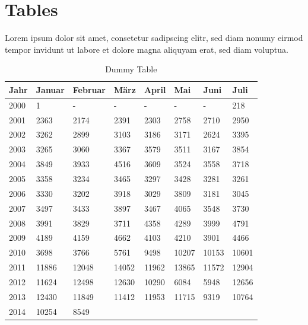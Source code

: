 \documentclass[
        ngerman,
        paper=a4,
        numbers=noendperiod,
]{scrreprt}
\begin{document}
\section{Tables}
Lorem ipsum dolor sit amet, consetetur sadipscing elitr, sed diam nonumy eirmod tempor invidunt ut labore et dolore magna aliquyam erat, sed diam voluptua.
\begin{table}[H]
{\small
   \begin{tabularx}{\textwidth}{X|X|X|X|X|X|X|X}
Jahr &  Januar &	Februar &	März & 	April & Mai & Juni & Juli\\ \toprule
    2000      &1      &-       &-       &-         &-       &-  &218\\
    2001      &2363      &2174      &2391    &2303      &2758      & 2710	&2950\\ 
    2002      &3262      &2899      &3103    &3186      &3171      &2624	&3395\\ 
    2003      &3265      &3060      &3367    &3579      &3511      &3167	&3854\\ 
    2004      &3849      &3933      &4516    &3609      &3524      &3558	&3718\\ 
    2005      &3358      &3234      &3465    &3297      &3428      &3281	&3261\\ 
    2006      &3330      &3202      &3918    &3029      &3809      &3181	&3045\\ 
    2007      &3497      &3433      &3897    &3467      &4065      &3548	&3730\\ 
    2008      &3991      &3829      &3711    &4358      &4289      &3999	&4791\\ 
    2009      &4189      &4159      &4662    &4103      &4210      &3901	&4466\\ 
    2010      &3698      &3766      &5761    &9498      &10207    &10153	&10601\\ 
    2011      &11886      &12048      &14052    &11962      &13865      &11572	&12904\\ 
    2012      &11624      &12498      &12630    &10290      &6084      &5948	&12656\\ 
    2013      &12430     &11849      &11412    &11953      &11715      &9319&10764\\ 
    2014      &10254      &8549      &    &     &      & & \\ 
  \end{tabularx}
\caption{Dummy Table}
    \label{tab:tab1}
}
\end{table}
\end{document}
